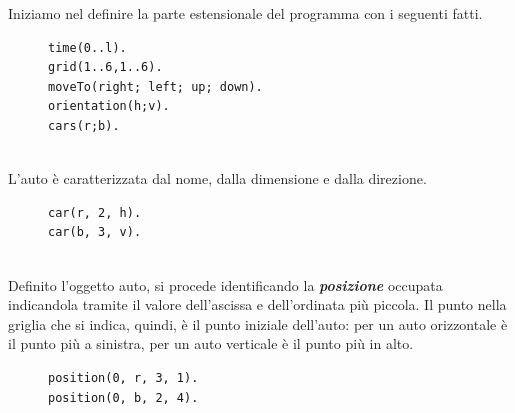 \documentclass[10pt, a4paper, oneside]{article}
\begin{document}
\noindent
Iniziamo nel definire la parte estensionale del programma con i seguenti fatti.%
\begin{figure}[htp]
\centering
\begin{verbatim}
time(0..l).
grid(1..6,1..6).
moveTo(right; left; up; down).
orientation(h;v).
cars(r;b).
\end{verbatim}
\end{figure}


\noindent
\\L'auto è caratterizzata dal nome, dalla dimensione e dalla direzione.%
\begin{figure}[htp]
\centering
\begin{verbatim}
car(r, 2, h).
car(b, 3, v).
\end{verbatim}
\label{code:car_defn}
\end{figure}

\noindent
\\Definito l'oggetto auto, si procede identificando la \emph{\textbf{posizione}} occupata indicandola tramite il valore dell'ascissa e dell'ordinata più piccola. Il punto nella griglia che si indica, quindi, è il punto iniziale dell'auto: per un auto orizzontale è il punto più a sinistra, per un auto verticale è il punto più in alto.
\begin{figure}[htp]
\centering
\begin{verbatim}
position(0, r, 3, 1).
position(0, b, 2, 4).
\end{verbatim}
\label{code:position0}
\end{figure}
\end{document}
